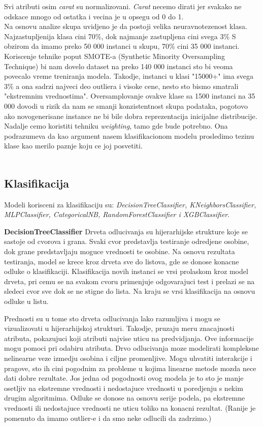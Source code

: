 \documentclass[10pt]{article}
\begin{document}
Svi atributi osim \textit{carat} su normalizovani. \textit{Carat} necemo dirati jer svakako ne odskace mnogo od ostatka i vecina je u opsegu od 0 do 1.\\

Na osnovu analize skupa uvidjeno je da postoji velika neuravnotezenost klasa. Najzastupljenija klasa cini 70\%, dok najmanje zastupljena cini svega 3\%
S obzirom da imamo preko 50 000 instanci u skupu, 70\% cini 35 000 instanci. Koriscenje tehnike poput SMOTE-a (Synthetic Minority Oversampling Technique) bi nam dovelo dataset na preko 140 000 instanci sto bi veoma povecalo vreme treniranja modela.
Takodje, instanci u klasi "15000+" ima svega 3\% a ona sadrzi najveci deo outliera i visoke cene, nesto sto bismo smatrali "ekstremnim vrednostima". Oversamplovanje ovakve klase sa 1500 instanci na 35 000 dovodi u rizik da nam se smanji konzistentnost skupa podataka, pogotovo ako novogenerisane instance ne bi bile dobra reprezentacija inicijalne distribucije. Nadalje cemo koristiti tehniku \textit{weighting}, tamo gde bude potrebno. Ona podrazumeva da kao argument nasem klasifikacionom modelu prosledimo tezinu klase kao merilo paznje koju ce joj posvetiti.\\\\

\subsection{Klasifikacija}
Modeli korisceni za klasifikaciju su: \textit{DecisionTreeClassifier, KNeighborsClassifier, MLPClassifier, CategoricalNB, RandomForestClassifier i XGBClassifier}.

\textbf{DecisionTreeClassifier}
Drveta odlucivanja su hijerarhijske strukture koje se sastoje od cvorova i grana. Svaki cvor predstavlja testiranje odredjene osobine, dok grane predstavljaju moguce vrednosti te osobine. Na osnovu rezultata testiranja, model se krece kroz drveta sve do listova, gde se donose konacne odluke o klasifikaciji. Klasifikacija novih instanci se vrsi prolaskom kroz model drveta, pri cemu se na svakom cvoru primenjuje odgovarajuci test i prelazi se na sledeci cvor sve dok se ne stigne do lista. Na kraju se vrsi klasifikacija na osnovu odluke u listu.

Prednosti su u tome sto drveta odlucivanja lako razumljiva i mogu se vizualizovati u hijerarhijskoj strukturi. Takodje, pruzaju meru znacajnosti atributa, pokazujuci koji atributi najvise uticu na predvidjanja. Ove informacije mogu pomoci pri odabiru atributa. Drvo odlucivanja moze modelirati kompleksne nelinearne veze izmedju osobina i ciljne promenljive. Mogu uhvatiti interakcije i pragove, sto ih cini pogodnim za probleme u kojima linearne metode mozda nece dati dobre rezultate. Jos jedna od pogodnosti ovog modela je to sto je manje osetljiv na ekstremne vrednosti i nedostajuce vrednosti u poredjenju s nekim drugim algoritmima. Odluke se donose na osnovu serije podela, pa ekstremne vrednosti ili nedostajuce vrednosti ne uticu toliko na konacni rezultat. (Ranije je pomenuto da imamo outlier-e i da smo neke odlucili da zadrzimo.)\\
\end{document}
